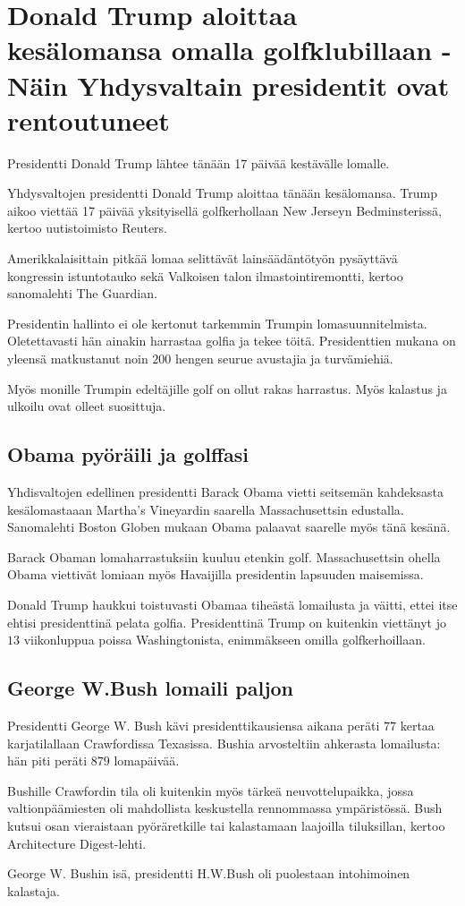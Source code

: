 \documentclass[a4paper,11pt]{article}
\begin{document}
  \section{Donald Trump aloittaa kesälomansa
  omalla golfklubillaan - Näin Yhdysvaltain
  presidentit ovat rentoutuneet}
  Presidentti Donald Trump lähtee tänään 17 päivää
  kestävälle lomalle.
  \par
  Yhdysvaltojen presidentti Donald Trump aloittaa tänään
  kesälomansa. Trump aikoo viettää 17 päivää yksityisellä
  golfkerhollaan New Jerseyn Bedminsterissä, kertoo
  uutistoimisto Reuters.
  \par
  Amerikkalaisittain pitkää lomaa selittävät lainsäädäntötyön
  pysäyttävä kongressin istuntotauko sekä Valkoisen talon
  ilmastointiremontti, kertoo sanomalehti The Guardian.
  \par
  Presidentin hallinto ei ole kertonut tarkemmin Trumpin
  lomasuunnitelmista. Oletettavasti hän ainakin harrastaa
  golfia ja tekee töitä. Presidenttien mukana on yleensä
  matkustanut noin $200$ hengen seurue avustajia ja
  turvämiehiä.
  \par
  Myös monille Trumpin edeltäjille golf on ollut rakas
  harrastus. Myös kalastus ja ulkoilu ovat olleet suosittuja.
  \subsection{Obama pyöräili ja golffasi}
  Yhdisvaltojen edellinen presidentti Barack Obama vietti
  seitsemän kahdeksasta kesälomastaaan Martha's Vineyardin
  saarella Massachusettsin edustalla. Sanomalehti Boston
  Globen mukaan Obama palaavat saarelle myös tänä kesänä.
  \par
  Barack Obaman lomaharrastuksiin kuuluu etenkin golf.
  Massachusettsin ohella Obama viettivät lomiaan myös
  Havaijilla presidentin lapsuuden maisemissa.
  \par
  Donald Trump haukkui toistuvasti Obamaa tiheästä lomailusta
  ja väitti, ettei itse ehtisi presidenttinä pelata golfia.
  Presidenttinä Trump on kuitenkin viettänyt jo $13$
  viikonluppua poissa Washingtonista, enimmäkseen omilla
  golfkerhoillaan.
  \subsection{George W.Bush lomaili paljon}
  Presidentti George W. Bush kävi presidenttikausiensa aikana
  peräti $77$ kertaa karjatilallaan Crawfordissa Texasissa.
  Bushia arvosteltiin ahkerasta lomailusta: hän piti peräti
  $879$ lomapäivää.
  \par
  Bushille Crawfordin tila oli kuitenkin myös tärkeä
  neuvottelupaikka, jossa valtionpäämiesten oli mahdollista
  keskustella rennommassa ympäristössä. Bush kutsui osan
  vieraistaan pyöräretkille tai kalastamaan laajoilla
  tiluksillan, kertoo Architecture Digest-lehti.
  \par
  George W. Bushin isä, presidentti H.W.Bush oli puolestaan
  intohimoinen kalastaja.
\end{document}

